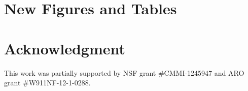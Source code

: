 \documentclass{article}
\begin{document}












\section{New Figures and Tables}









\section*{Acknowledgment}
This work was partially supported by NSF grant \#CMMI-1245947 and ARO
grant \#W911NF-12-1-0288.



\end{document}

